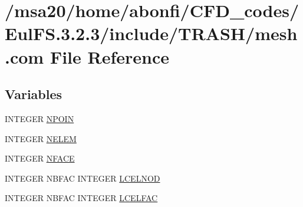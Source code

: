 \hypertarget{msa20_2home_2abonfi_2_c_f_d__codes_2_eul_f_s_83_82_83_2include_2_t_r_a_s_h_2mesh_8com}{\section{/msa20/home/abonfi/\-C\-F\-D\-\_\-codes/\-Eul\-F\-S.3.2.3/include/\-T\-R\-A\-S\-H/mesh.com File Reference}
\label{msa20_2home_2abonfi_2_c_f_d__codes_2_eul_f_s_83_82_83_2include_2_t_r_a_s_h_2mesh_8com}
}
\subsection*{Variables}
\begin{DoxyCompactItemize}
\item 
I\-N\-T\-E\-G\-E\-R \hyperlink{msa20_2home_2abonfi_2_c_f_d__codes_2_eul_f_s_83_82_83_2include_2_t_r_a_s_h_2mesh_8com_ae28c1572321efcd8715b974d87d20c58}{N\-P\-O\-I\-N}
\item 
I\-N\-T\-E\-G\-E\-R \hyperlink{msa20_2home_2abonfi_2_c_f_d__codes_2_eul_f_s_83_82_83_2include_2_t_r_a_s_h_2mesh_8com_aee5e75b79d0e815c0603cfbccc618957}{N\-E\-L\-E\-M}
\item 
I\-N\-T\-E\-G\-E\-R \hyperlink{msa20_2home_2abonfi_2_c_f_d__codes_2_eul_f_s_83_82_83_2include_2_t_r_a_s_h_2mesh_8com_a78142d59d4cbb9fedbede16187658dd3}{N\-F\-A\-C\-E}
\item 
I\-N\-T\-E\-G\-E\-R N\-B\-F\-A\-C I\-N\-T\-E\-G\-E\-R \hyperlink{msa20_2home_2abonfi_2_c_f_d__codes_2_eul_f_s_83_82_83_2include_2_t_r_a_s_h_2mesh_8com_ad60bfbd45e7524439e47beda45c898ef}{L\-C\-E\-L\-N\-O\-D}
\item 
I\-N\-T\-E\-G\-E\-R N\-B\-F\-A\-C I\-N\-T\-E\-G\-E\-R \hyperlink{msa20_2home_2abonfi_2_c_f_d__codes_2_eul_f_s_83_82_83_2include_2_t_r_a_s_h_2mesh_8com_a1c18571472b5302b3a8ee29ece24bc40}{L\-C\-E\-L\-F\-A\-C}
\end{DoxyCompactItemize}


